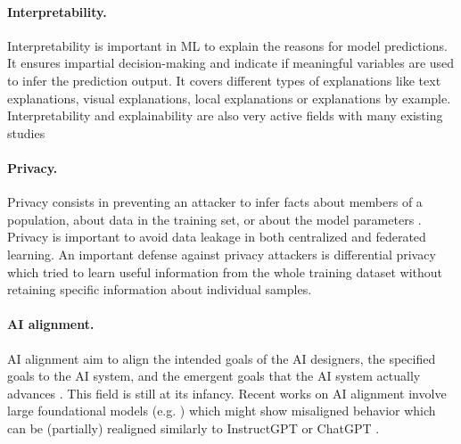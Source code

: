 \paragraph{Interpretability.} Interpretability is important in ML to explain the reasons for model predictions. It ensures impartial decision-making and indicate if meaningful variables are used to infer the prediction output. It covers different types of explanations like text explanations, visual explanations, local explanations or explanations by example. Interpretability and explainability are also very active fields with many existing studies \cite{arrieta2019explainable, overview-interpretable-ml}

\paragraph{Privacy.} Privacy consists in preventing an attacker to infer facts about members of a population, about data in the training set, or about the model parameters \cite{cristofaro2020privacy, cristofaro2021privacy}. Privacy is important to avoid data leakage in both centralized and federated learning. An important defense against privacy attackers is differential privacy \cite{buglesi2006privacy} which tried to learn useful information from the whole training dataset without retaining specific information about individual samples.


\paragraph{AI alignment.} AI alignment aim to align the intended goals of the AI designers,  the specified goals to the AI system, and the emergent goals that the AI system actually advances \cite{bostrom2014superintelligence, gabriel2020AI}. This field is still at its infancy. Recent works on AI alignment involve large foundational models (e.g. \cite{gpt, rombach2021highresolution, galactica}) which might show misaligned behavior which can be (partially) realigned similarly to InstructGPT \cite{instructgpt} or ChatGPT \cite{chatgpt}.

